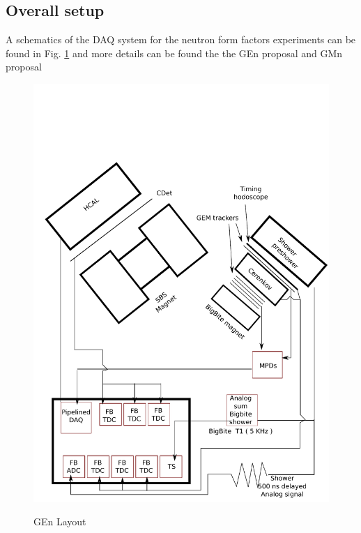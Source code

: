 \documentclass{article}
\begin{document}
\subsection {Overall setup}
A schematics of the DAQ system for the neutron form factors experiments can be found in Fig. \ref{fig:GENlayout}
and more details can be found the the GEn proposal \cite{GEnProp} and GMn proposal \cite{GMnProp}
\begin{figure}
\includegraphics[scale=0.55]{figs/GeNlayout.pdf}\\
  \caption{GEn Layout}\label{fig:GENlayout}

\end{figure}
\end{document}
